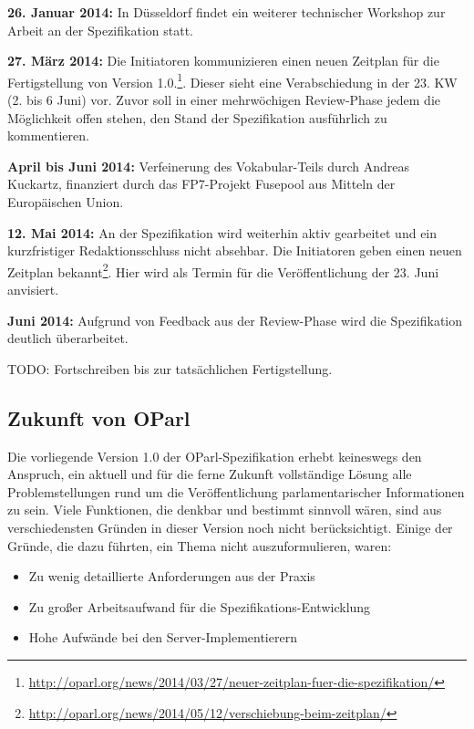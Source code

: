 \documentclass[,a4paper]{article}
\begin{document}
\textbf{26. Januar 2014:} In Düsseldorf findet ein weiterer technischer
Workshop zur Arbeit an der Spezifikation statt.

\textbf{27. März 2014:} Die Initiatoren kommunizieren einen neuen
Zeitplan für die Fertigstellung von Version 1.0.\footnote{\url{http://oparl.org/news/2014/03/27/neuer-zeitplan-fuer-die-spezifikation/}}.
Dieser sieht eine Verabschiedung in der 23. KW (2. bis 6 Juni) vor.
Zuvor soll in einer mehrwöchigen Review-Phase jedem die Möglichkeit
offen stehen, den Stand der Spezifikation ausführlich zu kommentieren.

\textbf{April bis Juni 2014:} Verfeinerung des Vokabular-Teils durch
Andreas Kuckartz, finanziert durch das FP7-Projekt Fusepool aus Mitteln
der Europäischen Union.

\textbf{12. Mai 2014:} An der Spezifikation wird weiterhin aktiv
gearbeitet und ein kurzfristiger Redaktionsschluss nicht absehbar. Die
Initiatoren geben einen neuen Zeitplan bekannt\footnote{\url{http://oparl.org/news/2014/05/12/verschiebung-beim-zeitplan/}}.
Hier wird als Termin für die Veröffentlichung der 23. Juni anvisiert.

\textbf{Juni 2014:} Aufgrund von Feedback aus der Review-Phase wird die
Spezifikation deutlich überarbeitet.

TODO: Fortschreiben bis zur tatsächlichen Fertigstellung.

\subsection{Zukunft von OParl}\label{zukunft-von-oparl}

Die vorliegende Version 1.0 der OParl-Spezifikation erhebt keineswegs
den Anspruch, ein aktuell und für die ferne Zukunft vollständige Lösung
alle Problemstellungen rund um die Veröffentlichung parlamentarischer
Informationen zu sein. Viele Funktionen, die denkbar und bestimmt
sinnvoll wären, sind aus verschiedensten Gründen in dieser Version noch
nicht berücksichtigt. Einige der Gründe, die dazu führten, ein Thema
nicht auszuformulieren, waren:

\begin{itemize}
\itemsep1pt\parskip0pt
\item
  Zu wenig detaillierte Anforderungen aus der Praxis
\item
  Zu großer Arbeitsaufwand für die Spezifikations-Entwicklung
\item
  Hohe Aufwände bei den Server-Implementierern
\end{itemize}
\end{document}
